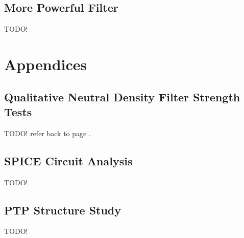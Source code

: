 \documentclass{report}
\begin{document}
        \section{More Powerful Filter} \label{sect:new_filters}
            TODO!





    \chapter{Appendices}
        \section{Qualitative Neutral Density Filter Strength Tests} \label{sect:filter_tests}
            TODO! refer back to page \pageref{page:504_to_black_filter}.

        \section{SPICE Circuit Analysis}
            TODO!

        \section{PTP Structure Study} \label{sect:ptp_study}
            TODO!
\end{document}

